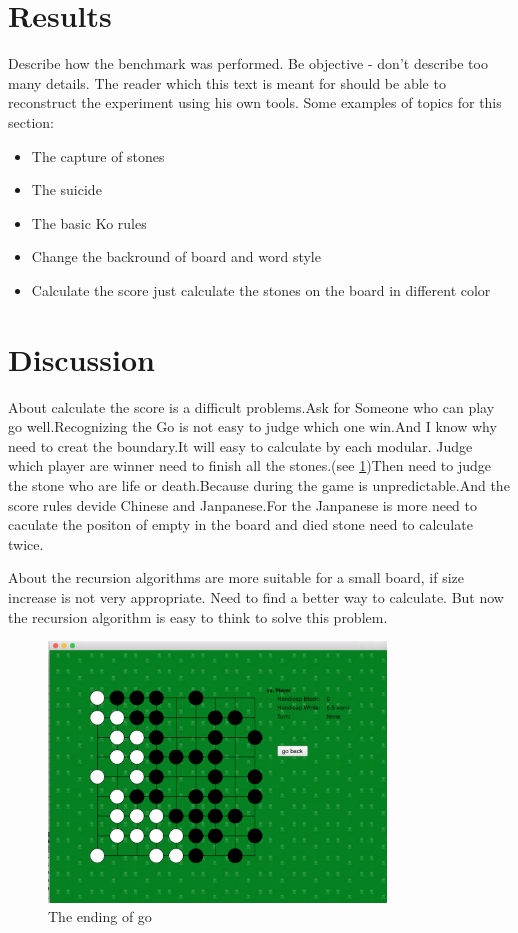 \documentclass[a4,10pt]{article}
\begin{document}
  \section{Results}
  Describe how the benchmark was performed. Be objective - don't describe too many details.
  The reader which this text is meant for should be able to reconstruct the experiment using his own tools.
  Some examples of topics for this section:
    \begin{itemize}
      \item The capture of stones
      \item The suicide
      \item The basic Ko rules
      \item Change the backround of board and word style
      \item Calculate the score just calculate the stones on the board in different color
      \end{itemize}

  \section{Discussion}
About calculate the score is a difficult problems.Ask for Someone who can play go well.Recognizing the Go is not easy to judge which
one win.And I know why need to creat the boundary.It will easy to calculate by each modular.
Judge which player are winner need to finish all the stones.(see \cref{fig:finish})Then need to judge the stone who are
life or death.Because during the game is unpredictable.And the score rules devide Chinese and Janpanese.For the Janpanese is more
need to caculate the positon of empty in the board and died stone need to calculate twice.


About the recursion algorithms are more suitable for a small board, if size increase is not very appropriate.
Need to find a better way to calculate. But now the recursion algorithm is easy to think to solve this problem.


        \begin{figure}[tbp]
         \centering
        \includegraphics[width=0.80\textwidth]{gfx/finish.png}
        \caption{The ending of go  }
        \label{fig:finish}
        \end{figure}
\end{document}
